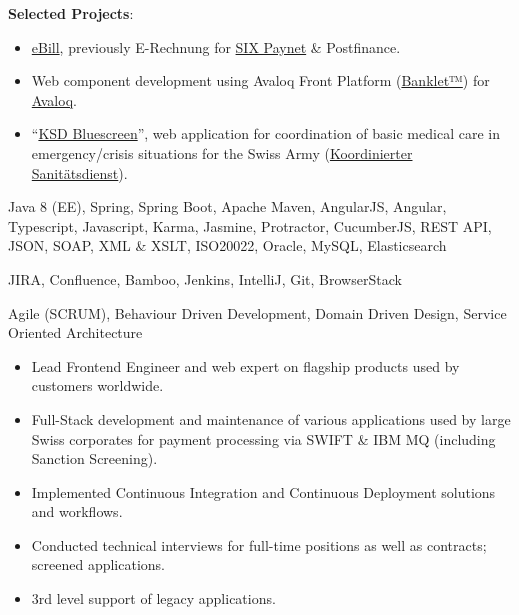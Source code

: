 \smallskip
\textbf{Selected Projects}:
\smallskip
\begin{itemize}
	\item \href{https://www.ebill.ch/}{eBill}, previously E-Rechnung for \href{https://www.six-group.com/en/site/banking-services/paynet.html}{SIX Paynet} \& Postfinance.
	\item Web component development using Avaloq Front Platform (\href{https://developer.avaloq.com/web/developer-portal/learn}{Banklet™}) for \href{https://www.avaloq.com/en/}{Avaloq}.
	\item \enquote{\href{https://blog.alertswiss.ch/de/rubriken/bevoelkerungsschutz/koordinierter-sanitaetsdienst-ksd-neues-management-tool-blue-screen-switzerland/}{KSD Bluescreen}}, web application for coordination of basic medical care in emergency/crisis situations for the Swiss Army (\href{https://www.vtg.admin.ch/de/organisation/astab/san/ksd.html}{Koordinierter Sanitätsdienst}).
\end{itemize}

\medskip
\begin{description}
	\ifincludestech
	\item [Technologies] Java 8 (EE), Spring, Spring Boot, Apache Maven, AngularJS, Angular, Typescript, Javascript, Karma, Jasmine, Protractor, CucumberJS, REST API, JSON, SOAP, XML \& XSLT, ISO20022, Oracle, MySQL, Elasticsearch
	\fi
	\ifincludestools
	\item [Tools] JIRA, Confluence, Bamboo, Jenkins, IntelliJ, Git, BrowserStack
	\fi
	\ifincludesmethods
	\item [Methodologies] Agile (SCRUM), Behaviour Driven Development, Domain Driven Design, Service Oriented Architecture
	\fi
\end{description}

\divider


\medskip
\begin{itemize}
	\item Lead Frontend Engineer and web expert on flagship products used by customers worldwide.
	\item Full-Stack development and maintenance of various applications used by large Swiss corporates for payment processing via SWIFT \& IBM MQ (including Sanction Screening).
	\item Implemented Continuous Integration and Continuous Deployment solutions and workflows. 
	\item Conducted technical interviews for full-time positions as well as contracts; screened applications.
	\item 3rd level support of legacy applications.
\end{itemize}

